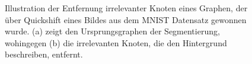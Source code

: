 \begin{figure}[t]
\centering
{}
\caption[Entfernung irrelevanter Knoten]{Illustration der Entfernung irrelevanter Knoten eines Graphen, der über Quickshift eines Bildes aus dem \gls{MNIST} Datensatz gewonnen wurde.
(a) zeigt den Ursprungsgraphen der Segmentierung, wohingegen (b) die irrelevanten Knoten, die den Hintergrund beschreiben, entfernt.}
\label{fig:knotenentfernung}
\end{figure}
